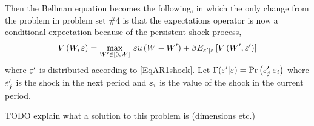 Then the Bellman equation becomes the following, in which the only change from the problem in problem set \#4 is that the expectations operator is now a conditional expectation because of the persistent shock process,
\begin{equation*}
   V\left(W,\varepsilon\right) = \max_{W'\in[0,W]}\: \varepsilon u\left(W - W'\right) + \beta E_{\varepsilon'|\varepsilon}\left[V\left(W',\varepsilon'\right)\right]
\end{equation*}
where $\varepsilon'$ is distributed according to \eqref{EqAR1shock}. Let $\Gamma(\varepsilon'|\varepsilon)=\text{Pr}\left(\varepsilon_j'|\varepsilon_i\right)$ where $\varepsilon_j'$ is the shock in the next period and $\varepsilon_i$ is the value of the shock in the current period.

TODO explain what a solution to this problem is (dimensions etc.)
\vspace{5mm}

